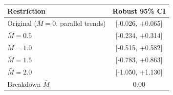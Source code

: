 \begin{tabular}{lc}
\toprule
Restriction & Robust 95\% CI \\
\midrule
Original ($\bar{M}=0$, parallel trends) & [-0.026, +0.065] \\
$\bar{M}=0.5$ & [-0.234, +0.314] \\
$\bar{M}=1.0$ & [-0.515, +0.582] \\
$\bar{M}=1.5$ & [-0.783, +0.863] \\
$\bar{M}=2.0$ & [-1.050, +1.130] \\
\midrule
Breakdown $\bar{M}$ & 0.00 \\
\bottomrule
\end{tabular}
